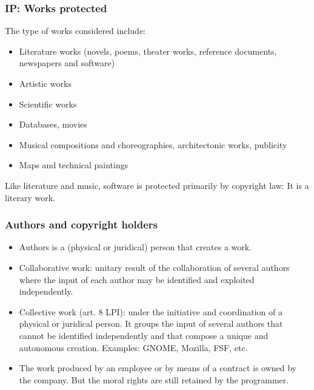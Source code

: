 \begin{frame}
\frametitle{IP: Works protected}

The type of works considered include:

\begin{itemize}
\item Literature works (novels, poems, theater works, reference documents, newspapers and software)
\item Artistic works 
\item Scientific works 
\item Databases, movies 
\item Musical compositions and choreographies, architectonic works, publicity 
\item Maps and technical paintings
\end{itemize}

Like literature and music, \alert{software} is protected primarily by copyright law: It is a \alert{literary work}.
\end{frame}




\begin{frame}
\frametitle{Authors and copyright holders}

\begin{itemize}

\item Authors is a (physical or juridical) person that creates
a work. 

\item \alert{Collaborative work}: unitary result of the collaboration
of several authors where the input of each author may be
identified and exploited independently.

\item \alert{Collective work} (art. 8 LPI): under the initiative and coordination of
a physical or juridical person. It groups the input
of several authors that cannot be identified independently
and that compose a unique and autonomous creation. Examples: GNOME,
Mozilla, FSF, etc.

\item The work produced by an employee or by means of 
a contract is owned by the company.
But the moral rights are still retained by the programmer.

\end{itemize}

\end{frame}

